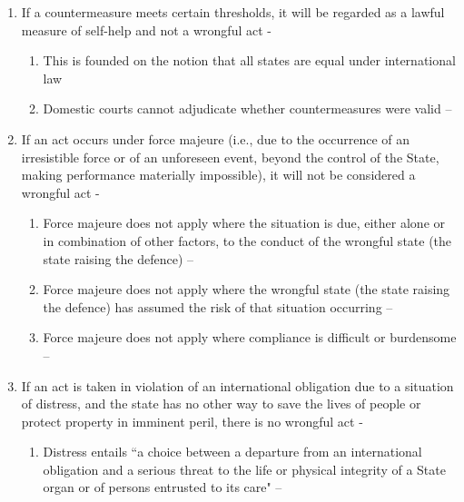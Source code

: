 \begin{enumerate}
\begin{enumerate}
        \item If a countermeasure meets certain thresholds, it will be regarded as a lawful measure of self-help and not a wrongful act -
        \begin{enumerate}
            \item This is founded on the notion that all states are equal under international law
            \item Domestic courts cannot adjudicate whether countermeasures were valid -- 
        \end{enumerate}
        \item If an act occurs under force majeure (i.e., due to the occurrence of an irresistible force or of an unforeseen event, beyond the control of the State, making performance materially impossible), it will not be considered a wrongful act -
        \begin{enumerate}
            \item Force majeure does not apply where the situation is due, either alone or in combination of other factors, to the conduct of the wrongful state (the state raising the defence) -- 
            \item Force majeure does not apply where the wrongful state (the state raising the defence) has assumed the risk of that situation occurring -- 
            \item Force majeure does not apply where compliance is difficult or burdensome -- 
        \end{enumerate}
        \item If an act is taken in violation of an international obligation due to a situation of distress, and the state has no other way to save the lives of people or protect property in imminent peril, there is no wrongful act -
        \begin{enumerate}
            \item Distress entails ``a choice between a departure from an international obligation and a serious threat to the life or physical integrity of a State organ or of persons entrusted to its care" -- 

\end{enumerate}
\end{enumerate}
\end{enumerate}
